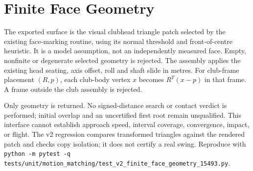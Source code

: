 \documentclass{article}
\begin{document}
\section{Finite Face Geometry}
The exported surface is the visual clubhead triangle patch selected by the
existing face-marking routine, using its normal threshold and front-of-centre
heuristic. It is a model assumption, not an independently measured face.
Empty, nonfinite or degenerate selected geometry is rejected. The assembly
applies the existing head seating, axis offset, roll and shaft slide in metres.
For club-frame placement $(R,p)$, each club-body vertex $x$ becomes
$R^{T}(x-p)$ in that frame. A frame outside the club assembly is rejected.

Only geometry is returned. No signed-distance search or contact verdict is
performed; initial overlap and an uncertified first root remain unqualified.
This interface cannot establish approach speed, interval coverage, convergence,
impact, or flight. The v2 regression compares transformed triangles against the
rendered patch and checks copy isolation; it does not certify a real swing.
Reproduce with \texttt{python -m pytest -q
tests/unit/motion\_matching/test\_v2\_finite\_face\_geometry\_15493.py}.
\end{document}
